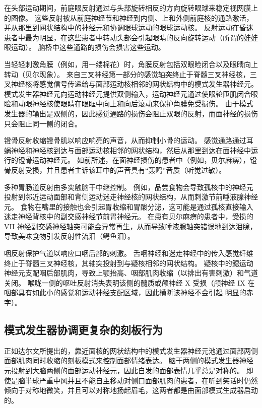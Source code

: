 在头部运动期间，前庭眼反射通过与头部旋转相反的方向旋转眼球来稳定视网膜上的图像。
这些反射被从前庭神经节和神经到内侧、上和外侧前庭核的通路激活，并从那里到网状结构中的神经元和协调眼球运动的眼球运动核。
反射运动在昏迷患者中最为明显，在这些患者中转动头部会引起眼睛的反向旋转运动（所谓的娃娃眼运动）。
脑桥中这些通路的损伤会损害这些运动。


当轻轻刺激角膜（例如，用一缕棉花）时，角膜反射包括双眼睑闭合以及眼睛向上转动（贝尔现象）。
来自三叉神经第一部分的感觉轴突终止于脊髓三叉神经核，三叉神经核将感觉信号传递给与面部运动核相邻的网状结构中的模式发生器神经元。
模式发生器神经元向运动神经元提供双侧输入，运动神经元通过使眼轮匝肌闭合眼睑和动眼神经核使眼睛在眼眶中向上和向后滚动来保护角膜免受损伤。
由于模式发生器的输出是双侧的，因此感觉通路的损伤会阻止双眼的反射，而面神经的损伤只会阻止同一侧的闭合。


镫骨反射收缩镫骨肌以响应响亮的声音，从而抑制小骨的运动。
感觉通路通过耳蜗神经和神经核到达与面部运动核相邻的网状结构，然后从那里到达在面神经中运行的镫骨运动神经元。
如前所述，在面神经损伤的患者中（例如，贝尔麻痹），镫骨反射受损，并且患者主诉该耳中的声音具有“轰鸣”音质（听觉过敏）。


多种胃肠道反射由多突触脑干中继控制。
例如，品尝食物会导致孤核中的神经元投射到邻近运动面部和背侧运动迷走神经核的网状结构，从而刺激节前唾液腺神经元。
食物在嘴里的接触也会引起胃收缩和胃酸分泌，这可能是通过孤核直接输入迷走神经背核中的副交感神经节前胃神经元。
在患有贝尔麻痹的患者中，受损的 VII 神经副交感神经轴突可能会异常再生，从而导致唾液腺轴突错误地到达泪腺，导致美味食物引发反射性流泪（鳄鱼泪）。


咽反射保护气道以响应口咽后部的刺激。
舌咽神经和迷走神经中的传入感觉纤维终止于脊髓三叉神经核，其轴突投射到与疑核相邻的网状结构。
疑核中的鳃运动神经元支配咽后部肌肉，导致上颚抬高、咽部肌肉收缩（以排出有害刺激）和气道关闭。 喉咙一侧的呕吐反射消失表明该侧的髓质或颅神经 X 受损（颅神经 IX 在咽部具有如此小的感觉和运动神经支配区域，因此横断该神经不会引起 明显的赤字）。



\subsection{模式发生器协调更复杂的刻板行为}

正如达尔文所提出的，靠近面核的网状结构中的模式发生器神经元池通过面部两侧面部肌肉同时收缩的刻板模式来控制面部情绪表达。
脑干两侧的模式发生器神经元投射到大脑两侧的面部运动神经元，因此自发的面部表情几乎总是对称的。
即使是脑半球严重中风并且不能自主移动对侧口面部肌肉的患者，在听到笑话时仍然倾向于对称地微笑，并且可以对称地扬起眉毛，这两者都是由面部模式生成器启动的。


